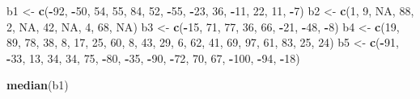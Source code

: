 \documentclass[
]{article}
\newenvironment{Shaded}{\begin{snugshade}}{\end{snugshade}}
\newcommand{\ConstantTok}[1]{\textcolor[rgb]{0.56,0.35,0.01}{#1}}
\newcommand{\DecValTok}[1]{\textcolor[rgb]{0.00,0.00,0.81}{#1}}
\newcommand{\FunctionTok}[1]{\textcolor[rgb]{0.13,0.29,0.53}{\textbf{#1}}}
\newcommand{\NormalTok}[1]{#1}
\newcommand{\OtherTok}[1]{\textcolor[rgb]{0.56,0.35,0.01}{#1}}
\newcommand{\SpecialCharTok}[1]{\textcolor[rgb]{0.81,0.36,0.00}{\textbf{#1}}}
\begin{document}
\begin{Shaded}
\begin{Highlighting}[]
\NormalTok{b1 }\OtherTok{\textless{}{-}} \FunctionTok{c}\NormalTok{(}\SpecialCharTok{{-}}\DecValTok{92}\NormalTok{, }\SpecialCharTok{{-}}\DecValTok{50}\NormalTok{, }\DecValTok{54}\NormalTok{, }\DecValTok{55}\NormalTok{, }\DecValTok{84}\NormalTok{, }\DecValTok{52}\NormalTok{, }\SpecialCharTok{{-}}\DecValTok{55}\NormalTok{, }\SpecialCharTok{{-}}\DecValTok{23}\NormalTok{, }\DecValTok{36}\NormalTok{, }\SpecialCharTok{{-}}\DecValTok{11}\NormalTok{, }\DecValTok{22}\NormalTok{, }\DecValTok{11}\NormalTok{, }\SpecialCharTok{{-}}\DecValTok{7}\NormalTok{)}
\NormalTok{b2 }\OtherTok{\textless{}{-}} \FunctionTok{c}\NormalTok{(}\DecValTok{1}\NormalTok{, }\DecValTok{9}\NormalTok{, }\ConstantTok{NA}\NormalTok{, }\DecValTok{88}\NormalTok{, }\DecValTok{2}\NormalTok{, }\ConstantTok{NA}\NormalTok{, }\DecValTok{42}\NormalTok{, }\ConstantTok{NA}\NormalTok{, }\DecValTok{4}\NormalTok{, }\DecValTok{68}\NormalTok{, }\ConstantTok{NA}\NormalTok{)}
\NormalTok{b3 }\OtherTok{\textless{}{-}} \FunctionTok{c}\NormalTok{(}\SpecialCharTok{{-}}\DecValTok{15}\NormalTok{, }\DecValTok{71}\NormalTok{, }\DecValTok{77}\NormalTok{, }\DecValTok{36}\NormalTok{, }\DecValTok{66}\NormalTok{, }\SpecialCharTok{{-}}\DecValTok{21}\NormalTok{, }\SpecialCharTok{{-}}\DecValTok{48}\NormalTok{, }\SpecialCharTok{{-}}\DecValTok{8}\NormalTok{)}
\NormalTok{b4 }\OtherTok{\textless{}{-}} \FunctionTok{c}\NormalTok{(}\DecValTok{19}\NormalTok{, }\DecValTok{89}\NormalTok{, }\DecValTok{78}\NormalTok{, }\DecValTok{38}\NormalTok{, }\DecValTok{8}\NormalTok{, }\DecValTok{17}\NormalTok{, }\DecValTok{25}\NormalTok{, }\DecValTok{60}\NormalTok{, }\DecValTok{8}\NormalTok{, }\DecValTok{43}\NormalTok{, }\DecValTok{29}\NormalTok{, }\DecValTok{6}\NormalTok{, }\DecValTok{62}\NormalTok{, }\DecValTok{41}\NormalTok{, }\DecValTok{69}\NormalTok{, }\DecValTok{97}\NormalTok{, }\DecValTok{61}\NormalTok{, }\DecValTok{83}\NormalTok{, }\DecValTok{25}\NormalTok{, }\DecValTok{24}\NormalTok{)}
\NormalTok{b5 }\OtherTok{\textless{}{-}} \FunctionTok{c}\NormalTok{(}\SpecialCharTok{{-}}\DecValTok{91}\NormalTok{, }\SpecialCharTok{{-}}\DecValTok{33}\NormalTok{, }\DecValTok{13}\NormalTok{, }\DecValTok{34}\NormalTok{, }\DecValTok{34}\NormalTok{, }\DecValTok{75}\NormalTok{, }\SpecialCharTok{{-}}\DecValTok{80}\NormalTok{, }\SpecialCharTok{{-}}\DecValTok{35}\NormalTok{, }\SpecialCharTok{{-}}\DecValTok{90}\NormalTok{, }\SpecialCharTok{{-}}\DecValTok{72}\NormalTok{, }\DecValTok{70}\NormalTok{, }\DecValTok{67}\NormalTok{, }\SpecialCharTok{{-}}\DecValTok{100}\NormalTok{, }\SpecialCharTok{{-}}\DecValTok{94}\NormalTok{, }\SpecialCharTok{{-}}\DecValTok{18}\NormalTok{)}

\FunctionTok{median}\NormalTok{(b1)}
\end{Highlighting}
\end{Shaded}
\end{document}
